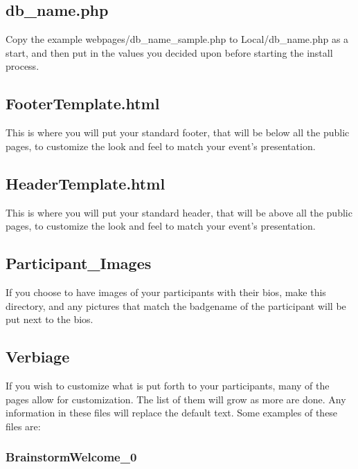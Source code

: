 \documentclass[tablesignature]{scrartcl}
\begin{document}
\subsection{db\_{}name.php}
\label{sec-3_1}

     Copy the example webpages/db\_{}name\_{}sample.php to Local/db\_{}name.php
     as a start, and then put in the values you decided upon before
     starting the install process.
\subsection{FooterTemplate.html}
\label{sec-3_2}

     This is where you will put your standard footer, that will be
     below all the public pages, to customize the look and feel to
     match your event's presentation.
\subsection{HeaderTemplate.html}
\label{sec-3_3}

     This is where you will put your standard header, that will be
     above all the public pages, to customize the look and feel to
     match your event's presentation.
\subsection{Participant\_{}Images}
\label{sec-3_4}

     If you choose to have images of your participants with their
     bios, make this directory, and any pictures that match the
     badgename of the participant will be put next to the bios.
\subsection{Verbiage}
\label{sec-3_5}

     If you wish to customize what is put forth to your participants,
     many of the pages allow for customization.  The list of them will
     grow as more are done.  Any information in these files will
     replace the default text.  Some examples of these files are:
\subsubsection{BrainstormWelcome\_{}0}
\label{sec-3_5_1}
\end{document}
